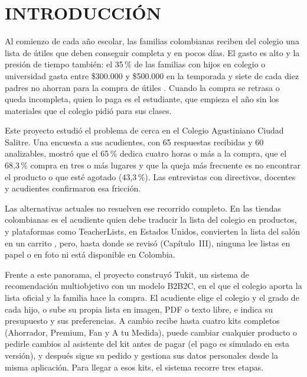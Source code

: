 \section{INTRODUCCIÓN}\label{cap:introduccion}

Al comienzo de cada año escolar, las familias colombianas reciben del colegio una lista de
útiles que deben conseguir completa y en pocos días. El gasto es alto y la presión de tiempo también: el 35\,\% de las familias con hijos en colegio o universidad gasta entre \$300.000 y
\$500.000 en la temporada \citep{noauthor_resultados_2025} y siete de cada diez padres no ahorran para la compra de útiles
\citep{noauthor_resultados_2024}. Cuando la compra se retrasa o queda incompleta, quien
lo paga es el estudiante, que empieza el año sin los materiales que el colegio pidió para
sus clases.\par

Este proyecto estudió el problema de cerca en el
Colegio Agustiniano Ciudad Salitre. Una encuesta a sus acudientes, con 65 respuestas
recibidas y 60 analizables, mostró que el 65\,\% dedica cuatro horas o más a la compra, que el 68,3\,\% compra
en tres o más lugares y que la queja más frecuente es no encontrar el producto o que esté
agotado (43,3\,\%). Las entrevistas con directivos, docentes y acudientes confirmaron esa
fricción.

Las alternativas actuales no resuelven ese recorrido completo. En las tiendas colombianas es el
acudiente quien debe traducir la lista del colegio en productos, y plataformas como TeacherLists, en Estados
Unidos, convierten la lista del salón en un carrito \citep{teacherlists_retail_2026}, pero, hasta donde se revisó (Capítulo~III), ninguna lee listas en papel o
en foto ni está disponible en Colombia.\par

Frente a este panorama, el proyecto construyó Tukit, un sistema de recomendación multiobjetivo con un
modelo B2B2C, en el que el colegio aporta la lista oficial y la familia hace la compra. El acudiente
elige el colegio y el grado de cada hijo, o sube su propia lista en imagen, PDF o texto libre, e indica
su presupuesto y sus preferencias. A cambio recibe hasta cuatro kits completos (Ahorrador, Premium, Fan y
A tu Medida), puede cambiar cualquier producto o pedirle cambios al asistente del kit antes de pagar (el pago es simulado en esta versión), y después sigue su pedido y gestiona sus datos personales desde la misma aplicación. Para
llegar a esos kits, el sistema recorre tres etapas.\par

